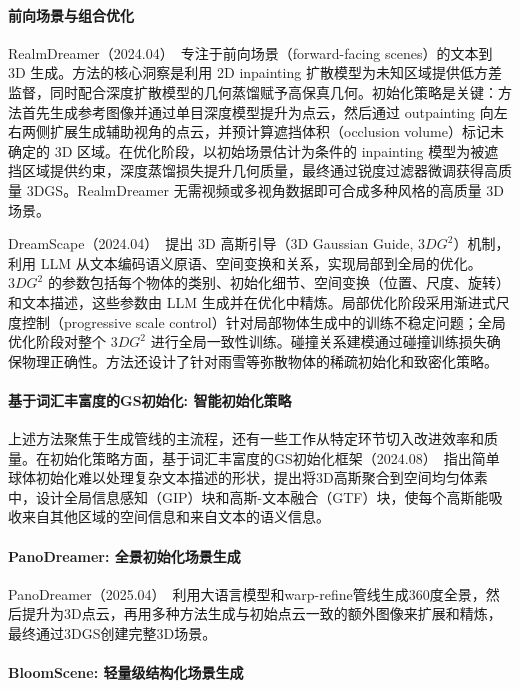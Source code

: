 \paragraph{前向场景与组合优化}

RealmDreamer（2024.04）~\cite{2404_07199}专注于前向场景（forward-facing scenes）的文本到 3D 生成。方法的核心洞察是利用 2D inpainting 扩散模型为未知区域提供低方差监督，同时配合深度扩散模型的几何蒸馏赋予高保真几何。初始化策略是关键：方法首先生成参考图像并通过单目深度模型提升为点云，然后通过 outpainting 向左右两侧扩展生成辅助视角的点云，并预计算遮挡体积（occlusion volume）标记未确定的 3D 区域。在优化阶段，以初始场景估计为条件的 inpainting 模型为被遮挡区域提供约束，深度蒸馏损失提升几何质量，最终通过锐度过滤器微调获得高质量 3DGS。RealmDreamer 无需视频或多视角数据即可合成多种风格的高质量 3D 场景。

DreamScape（2024.04）~\cite{2404_09227}提出 3D 高斯引导（3D Gaussian Guide, $3DG^2$）机制，利用 LLM 从文本编码语义原语、空间变换和关系，实现局部到全局的优化。$3DG^2$ 的参数包括每个物体的类别、初始化细节、空间变换（位置、尺度、旋转）和文本描述，这些参数由 LLM 生成并在优化中精炼。局部优化阶段采用渐进式尺度控制（progressive scale control）针对局部物体生成中的训练不稳定问题；全局优化阶段对整个 $3DG^2$ 进行全局一致性训练。碰撞关系建模通过碰撞训练损失确保物理正确性。方法还设计了针对雨雪等弥散物体的稀疏初始化和致密化策略。

\paragraph{基于词汇丰富度的GS初始化: 智能初始化策略}

上述方法聚焦于生成管线的主流程，还有一些工作从特定环节切入改进效率和质量。在初始化策略方面，基于词汇丰富度的GS初始化框架（2024.08）~\cite{2408_01269}指出简单球体初始化难以处理复杂文本描述的形状，提出将3D高斯聚合到空间均匀体素中，设计全局信息感知（GIP）块和高斯-文本融合（GTF）块，使每个高斯能吸收来自其他区域的空间信息和来自文本的语义信息。

\paragraph{PanoDreamer: 全景初始化场景生成}

PanoDreamer（2025.04）~\cite{2504_05152}利用大语言模型和warp-refine管线生成360度全景，然后提升为3D点云，再用多种方法生成与初始点云一致的额外图像来扩展和精炼，最终通过3DGS创建完整3D场景。

\paragraph{BloomScene: 轻量级结构化场景生成}

